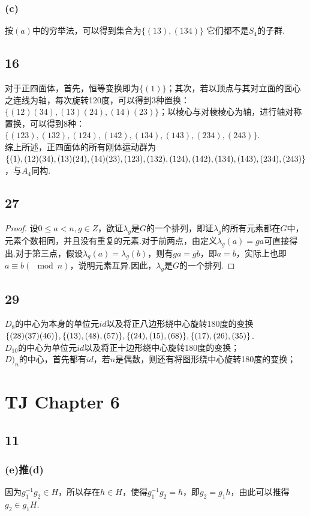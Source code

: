 \documentclass[twocolumn]{article}
\newenvironment{SChinese}{
	\CJKfamily{gbsn}
	\CJKtilde
	\CJKnospace}{}
\begin{document}
\begin{CJK}{UTF8}{}
\begin{SChinese}
					\subsubsection*{(c)}
						按$(a)$中的穷举法，可以得到集合为$\{(13),(134)\}$
					它们都不是$S_4$的子群.
				\subsection*{16}
					对于正四面体，首先，恒等变换即为$\{(1)\}$；其次，若以顶点与其对立面的面心之连线为轴，每次旋转120度，可以得到3种置换：$\{(12)(34),(13)(24),(14)(23)\}$；以棱心与对棱棱心为轴，进行轴对称置换，可以得到8种：$\{(123),(132),(124),(142),(134),(143),(234),(243)\}$.\\综上所述，正四面体的所有刚体运动群为$\{(1),(12)(34),(13)(24),(14)(23),(123),(132),(124),(142),\\(134),(143),(234),(243)\}$，与$A_4$同构.
				\subsection*{27}
					\begin{proof}
						设$0\le a<n,g\in Z$，欲证$\lambda_g$是$G$的一个排列，即证$\lambda_g$的所有元素都在$G$中，元素个数相同，并且没有重复的元素.对于前两点，由定义$\lambda_g(a)=ga$可直接得出.对于第三点，假设$\lambda_g(a)=\lambda_g(b)$，则有$ga=gb$，即$a=b$，实际上也即$a\equiv b(\mod n)$，说明元素互异.因此，$\lambda_g$是$G$的一个排列.
					\end{proof}
				\subsection*{29}
					$D_8$的中心为本身的单位元$id$以及将正八边形绕中心旋转180度的变换$\{(28)(37)(46)\},\{(13),(48),(57)\},\{(24),(15),(68)\},\\ \{(17),(26),(35)\}$.\\
					$D_10$的中心为单位元$id$以及将正十边形绕中心旋转180度的变换；\\
					$D)_n$的中心，首先都有$id$，若$n$是偶数，则还有将图形绕中心旋转180度的变换；
			\section*{TJ Chapter 6}
				\subsection*{11}
					\subsubsection*{(e)\textrm{推}(d)}
						因为$g_1^{-1}g_2\in H$，所以存在$h\in H$，使得$g_1^{-1}g_2=h$，即$g_2=g_1h$，由此可以推得$g_2\in g_1H$.

\end{SChinese}
\end{CJK}
\end{document}
